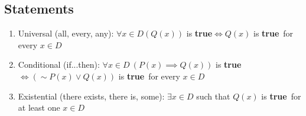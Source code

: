 \documentclass[landscape, a4paper]{article}
\newcommand{\Or}{\vee}
\newcommand{\true}{\textbf{true}}
\newcommand{\customsection}[1]{
    \vspace*{-16pt}
    \section*{#1}
    \vspace*{-4pt}
}
\newenvironment{wenumerate}{\begin{enumerate}[wide, labelindent=2pt]}{\end{enumerate}}
\begin{document}
\small
\begin{multicols*}{4}
    \vspace*{4pt}
    \customsection{Statements}
    \begin{wenumerate}
        \item Universal (all, every, any): $\forall x\in D (Q(x))$ is \true$\iff Q(x)$ is \true\ for every $x\in D$
        \item Conditional (if...then): $\forall x\in D\ (P(x) \implies Q(x))$ is \true$\iff ({\sim} P(x) \Or Q(x))$ is \true\ for every $x\in D$
        \item Existential (there exists, there is, some): $\exists x\in D$ such that $Q(x)$ is \true\ for at least one $x\in D$
    \end{wenumerate}


\end{multicols*}
\end{document}
